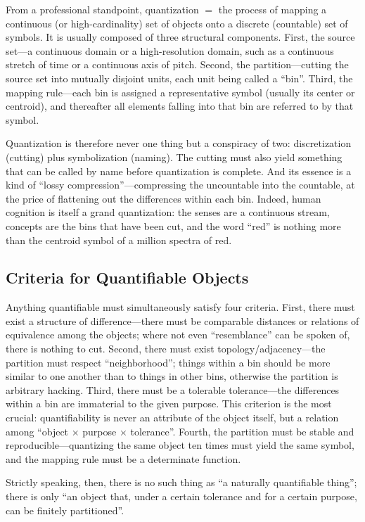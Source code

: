 \documentclass[11pt,a4paper]{article}
\begin{document}
From a professional standpoint, quantization $=$ the process of mapping a continuous (or
high-cardinality) set of objects onto a discrete (countable) set of symbols. It is usually
composed of three structural components. First, the source set---a continuous domain or a
high-resolution domain, such as a continuous stretch of time or a continuous axis of
pitch. Second, the partition---cutting the source set into mutually disjoint units, each
unit being called a ``bin''. Third, the mapping rule---each bin is assigned a
representative symbol (usually its center or centroid), and thereafter all elements
falling into that bin are referred to by that symbol.

Quantization is therefore never one thing but a conspiracy of two: discretization
(cutting) plus symbolization (naming). The cutting must also yield something that can be
called by name before quantization is complete. And its essence is a kind of ``lossy
compression''---compressing the uncountable into the countable, at the price of flattening
out the differences within each bin. Indeed, human cognition is itself a grand
quantization: the senses are a continuous stream, concepts are the bins that have been
cut, and the word ``red'' is nothing more than the centroid symbol of a million spectra of
red.

\subsection{Criteria for Quantifiable Objects}

Anything quantifiable must simultaneously satisfy four criteria. First, there must exist a
structure of difference---there must be comparable distances or relations of equivalence
among the objects; where not even ``resemblance'' can be spoken of, there is nothing to
cut. Second, there must exist topology/adjacency---the partition must respect
``neighborhood''; things within a bin should be more similar to one another than to things
in other bins, otherwise the partition is arbitrary hacking. Third, there must be a
tolerable tolerance---the differences within a bin are immaterial to the given purpose.
This criterion is the most crucial: quantifiability is never an attribute of the object
itself, but a relation among ``object $\times$ purpose $\times$ tolerance''. Fourth, the
partition must be stable and reproducible---quantizing the same object ten times must
yield the same symbol, and the mapping rule must be a determinate function.

Strictly speaking, then, there is no such thing as ``a naturally quantifiable thing'';
there is only ``an object that, under a certain tolerance and for a certain purpose, can be
finitely partitioned''.
\end{document}

